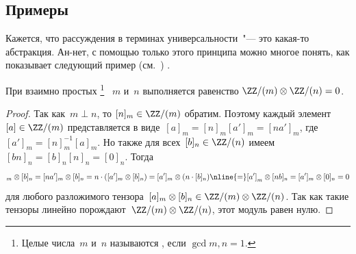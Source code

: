 \subsection{Примеры}

Кажется, что рассуждения в терминах универсальности~"--- это какая-то абстракция. Ан-нет, с помощью только этого принципа можно многое понять, как показывает следующий пример
(см.~\cite[10]{gorodentsev03})%
.

\begin{example}
	При взаимно простых%
	\footnote{%
		Целые числа~$m$ и~$n$ называются , если $\gcd{m, n} = 1$.%
	}%
	~$m$ и~$n$ выполняется равенство
	$\ZZ/(m) \otimes \ZZ/(n) = 0$.
\end{example}
\begin{proof}
	Так как~$m \perp n$, то $[n]_m \in \ZZ/(m)$ обратим. Поэтому каждый элемент~$[a] \in \ZZ/(m)$ представляется в виде~$[a]_m = [n]_m[a']_m = [na']_m$, где $[a']_m = [n]_m^{-1}[a]_m$. Но также для всех~$[b]_n \in \ZZ/(n)$ имеем~$[bn]_n = [b]_n [n]_n = [0]_n$. Тогда
	\begin{multline*}
		[a]_m \otimes [b]_n
		=
		[na']_m \otimes [b]_n
		=
		n \cdot ([a']_m \otimes [b]_n)
		=
		[a']_m \otimes (n \cdot [b]_n)
		\nline{=}
		[a']_m \otimes [nb]_n
		=
		[a']_m \otimes [0]_n
		=
		0
	\end{multline*}
	для любого разложимого тензора~$[a]_m \otimes [b]_n \in \ZZ/(m) \otimes \ZZ/(n)$. Так как такие тензоры линейно порождают~$\ZZ/(m) \otimes \ZZ/(n)$, этот модуль равен нулю.
\end{proof}

